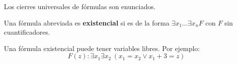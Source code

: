 \begin{obs}
    Los cierres universales de fórmulas son enunciados.
\end{obs}

\begin{dfn}
    Una fórmula abreviada es \textbf{existencial} si es de la forma $\exists x_1 \ldots \exists x_n F$ con $F$ sin cuantificadores.
\end{dfn}
\begin{eg}
    Una fórmula existencial puede tener variables libres. Por ejemplo:
    $$
        F(z):  \exists x_1 \exists x_2\ (x_1 = x_2 \lor x_1 + 3 = z)
    $$
\end{eg}
